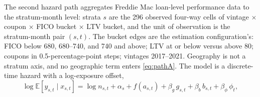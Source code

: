 \documentclass[12pt]{article}
\begin{document}
The second hazard path aggregates Freddie Mac loan-level performance data to the stratum-month level: strata $s$ are the 296 observed four-way cells of vintage $\times$ coupon $\times$ FICO bucket $\times$ LTV bucket, and the unit of observation is the stratum-month pair $(s,t)$. The bucket edges are the estimation configuration's: FICO below 680, 680--740, and 740 and above; LTV at or below versus above 80; coupons in 0.5-percentage-point steps; vintages 2017--2021. Geography is not a stratum axis, and no geographic term enters \eqref{eq:pathA}. The model is a discrete-time hazard with a log-exposure offset,
\begin{equation}\label{eq:pathA}
\log \mathbb{E}\!\left[y_{s,t} \mid x_{s,t}\right] = \log n_{s,t} + \alpha_{s} + f\!\left(a_{s,t}\right) + \beta_g\, g_{s,t} + \beta_b\, b_{s,t} + \beta_\phi\, \phi_t ,
\end{equation}
\end{document}
